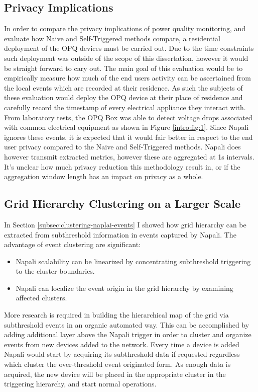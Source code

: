 \subsection{Privacy Implications}\label{subsec:privacy-implications}
In order to compare the privacy implications of power quality monitoring, and evaluate how Naive and Self-Triggered methods compare, a residential deployment of the OPQ devices must be carried out.
Due to the time constraints such deployment was outside of the scope of this dissertation, however it would be straight forward to cary out.
The main goal of this evaluation would be to empirically measure how much of the end users activity can be ascertained from the local events which are recorded at their residence.
As such the subjects of these evaluation would deploy the OPQ device at their place of residence and carefully record the timestamp of every electrical appliance they interact with.
From laboratory tests, the OPQ Box was able to detect voltage drops associated with common electrical equipment as shown in Figure \ref{intro:fig:1}.
Since Napali ignores these events, it is expected that it would fair better in respect to the end user privacy compared to the Naive and Self-Triggered methods.
Napali does however transmit extracted metrics, however these are aggregated at 1s intervals.
It's unclear how much privacy reduction this methodology result in, or if the aggregation window length has an impact on privacy as a whole.

\subsection{Grid Hierarchy Clustering on a Larger Scale}\label{subsec:grid-hierarchy-clustering-on-a-larger-scale}
In Section \ref{subsec:clustering-naplai-events} I showed how grid hierarchy can be extracted from subthreshold information in events captured by Napali.
The advantage of event clustering are significant:
\begin{itemize}
    \item Napali scalability can be linearized by concentrating subthreshold triggering to the cluster boundaries.
    \item Napali can localize the event origin in the grid hierarchy by examining affected clusters.
\end{itemize}

More research is required in building the hierarchical map of the grid via subthreshold events in an organic automated way.
This can be accomplished by adding additional layer above the Napali trigger in order to cluster and organize events from new devices added to the network.
Every time a device is added Napali would start by acquiring its subthreshold data if requested regardless which cluster the over-threshold event originated form.
As enough data is acquired, the new device will be placed in the appropriate cluster in the triggering hierarchy, and start normal operations.

